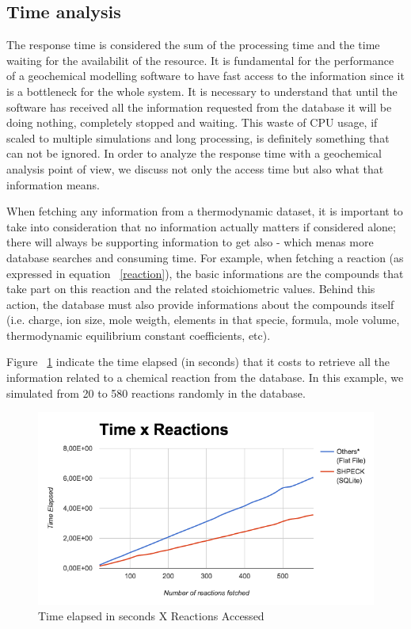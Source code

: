 \subsection{Time analysis}
The response time is considered the sum of the processing time and the time waiting for the availabilit of the resource. It is fundamental for the performance of a geochemical modelling software to have fast access to the information since it is a bottleneck for the whole system. 
It is necessary to understand that until the software has received all the information requested from the database it will be doing nothing, completely stopped and waiting. This waste of CPU usage, if scaled to multiple simulations and long processing, is definitely something that can not be ignored. 
In order to analyze the response time with a geochemical analysis point of view, we discuss not only the access time but also what that information means.

When fetching any information from a thermodynamic dataset, it is important to take into consideration that no information actually matters if considered alone; there will always be supporting information to get also - which menas more database searches and consuming time. For example, when fetching a reaction (as expressed in equation ~\ref{reaction}), the basic informations are the compounds that take part on this reaction and the related stoichiometric values. Behind this action, the database must also provide informations about the compounds itself (i.e. charge, ion size, mole weigth, elements in that specie, formula, mole volume, thermodynamic equilibrium constant coefficients, etc). 

Figure ~\ref{fig:timeXaccess} indicate the time elapsed (in seconds) that it costs to retrieve all the information related to a chemical reaction from the database. In this example, we simulated from 20 to 580 reactions randomly in the database.

\begin{figure}[ht!]
\centering
\includegraphics[width=140mm]{figures/timeXreactionAccess.png}
\caption{Time elapsed in seconds X Reactions Accessed}
\label{fig:timeXaccess}
\end{figure}


